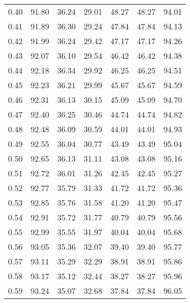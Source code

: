 \begin{tabular}{|c|c|c|c|c|c|c|}
      0.40 &     91.80 &     36.24 &      29.01 &   48.27 &      48.27 &         94.01 \\
      0.41 &     91.89 &     36.30 &      29.24 &   47.84 &      47.84 &         94.13 \\
      0.42 &     91.99 &     36.24 &      29.42 &   47.17 &      47.17 &         94.26 \\
      0.43 &     92.07 &     36.10 &      29.54 &   46.42 &      46.42 &         94.38 \\
      0.44 &     92.18 &     36.34 &      29.92 &   46.25 &      46.25 &         94.51 \\
      0.45 &     92.23 &     36.21 &      29.99 &   45.67 &      45.67 &         94.59 \\
      0.46 &     92.31 &     36.13 &      30.15 &   45.09 &      45.09 &         94.70 \\
      0.47 &     92.40 &     36.25 &      30.46 &   44.74 &      44.74 &         94.82 \\
      0.48 &     92.48 &     36.09 &      30.59 &   44.01 &      44.01 &         94.93 \\
      0.49 &     92.55 &     36.04 &      30.77 &   43.49 &      43.49 &         95.04 \\
      0.50 &     92.65 &     36.13 &      31.11 &   43.08 &      43.08 &         95.16 \\
      0.51 &     92.72 &     36.01 &      31.26 &   42.45 &      42.45 &         95.27 \\
      0.52 &     92.77 &     35.79 &      31.33 &   41.72 &      41.72 &         95.36 \\
      0.53 &     92.85 &     35.76 &      31.58 &   41.20 &      41.20 &         95.47 \\
      0.54 &     92.91 &     35.72 &      31.77 &   40.79 &      40.79 &         95.56 \\
      0.55 &     92.99 &     35.55 &      31.97 &   40.04 &      40.04 &         95.68 \\
      0.56 &     93.05 &     35.36 &      32.07 &   39.40 &      39.40 &         95.77 \\
      0.57 &     93.11 &     35.29 &      32.29 &   38.91 &      38.91 &         95.86 \\
      0.58 &     93.17 &     35.12 &      32.44 &   38.27 &      38.27 &         95.96 \\
      0.59 &     93.24 &     35.07 &      32.68 &   37.84 &      37.84 &         96.05 \\

\end{tabular}
